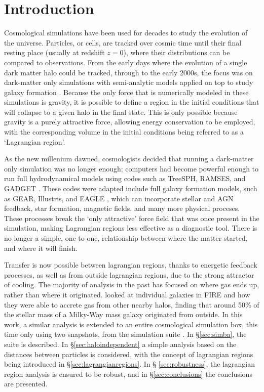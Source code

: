 \section{Introduction}
\label{sec:introduction}

Cosmological simulations have been used for decades to study the evolution of
the universe. Particles, or cells, are tracked over cosmic time until their
final resting place (usually at redshift $z=0$), where their distributions can
be compared to observations. From the early days where the evolution of a
single dark matter halo could be tracked, through to the early 2000s, the focus
was on dark-matter only simulations \citep{frenk1988,
springel_simulations_2005} with semi-analytic models applied on top to study
galaxy formation \citep{porter_2014, henriques_2015, lacey_2016}. Because the
only force that is numerically modeled in these simulations is gravity, it is
possible to define a region in the initial conditions that will collapse to a
given halo in the final state. This is only possible because gravity is a
purely attractive force, allowing energy conservation to be employed, with the
corresponding volume in the initial conditions being referred to as a
`Lagrangian region'.

As the new millenium dawned, cosmologists decided that running a dark-matter
only simulation was no longer enough; computers had become powerful enough to
run full hydrodynamical models using codes such as TreeSPH, RAMSES, and GADGET
\citep{Hernquist1989, teyssier2002, Springel2005}. These codes were adapted
include full galaxy formation models, such as GEAR, Illustris, and EAGLE
\citep{Revaz2011, vogelsberger_properties_2014, Schaye2015}, which can
incorporate stellar and AGN feedback, star formation, magnetic fields, and many
more physical proceses.  These processes break the `only attractive' force
field that was once present in the simulation, making Lagrangian regions less
effective as a diagnostic tool. There is no longer a simple, one-to-one,
relationship between where the matter started, and where it will finish.

Transfer is now possible between lagrangian regions, thanks to energetic
feedback processes, as well as from outside lagrangian regions, due to the
strong attractor of cooling. The majority of analysis in the past has focused
on where gas ends up, rather than where it originated.
\citet{anglesalcazar2016} looked at individual galaxies in FIRE
\citep{fireproject2014} and how they were able to accrete gas from other nearby
halos, finding that around 50\% of the stellar mass of a Milky-Way mass galaxy
originated from outside. In this work, a similar analysis is extended to an
entire cosmological simulation box, this time only using two snapshots, from
the \simba{} simulation suite \citep{dave2018}. In \S \ref{sec:simba}, the
\simba{} suite is described.  In \S \ref{sec:haloindependent} a simple analysis
based on the distances between particles is considered, with the concept of
lagrangian regions being introduced in \S \ref{sec:lagrangianregions}. In \S
\ref{sec:robustness}, the lagrangian region analysis is ensured to be robust,
and in \S \ref{sec:conclusions} the conclusions are presented.
